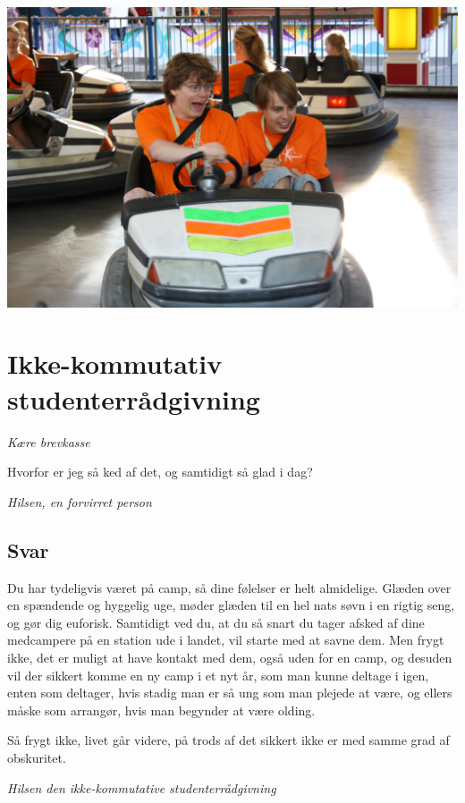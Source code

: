 \begin{minipage}[t]{120mm}
\vspace{3mm}

\includegraphics[width=\linewidth]{radiobil3.jpg}

\section*{Ikke-kommutativ studenterrådgivning}
\emph{Kære brevkasse}

Hvorfor er jeg så ked af det, og samtidigt så glad i dag?

\emph{Hilsen, en forvirret person}

\subsection*{Svar}

Du har tydeligvis været på camp, så dine følelser er helt almidelige. Glæden over en spændende og hyggelig uge, møder glæden til en hel nats søvn i en rigtig seng, og gør dig euforisk. Samtidigt ved du, at du så snart du tager afsked af dine medcampere på en station ude i landet, vil starte med at savne dem. Men frygt ikke, det er muligt at have kontakt med dem, også uden for en camp, og desuden vil der sikkert komme en ny camp i et nyt år, som man kunne deltage i igen, enten som deltager, hvis stadig man er så ung som man plejede at være, og ellers måske som arrangør, hvis man begynder at være olding.

Så frygt ikke, livet går videre, på trods af det sikkert ikke er med samme grad af obskuritet.

{\flushright\emph{Hilsen den ikke-kommutative studenterrådgivning}}


\end{minipage}
